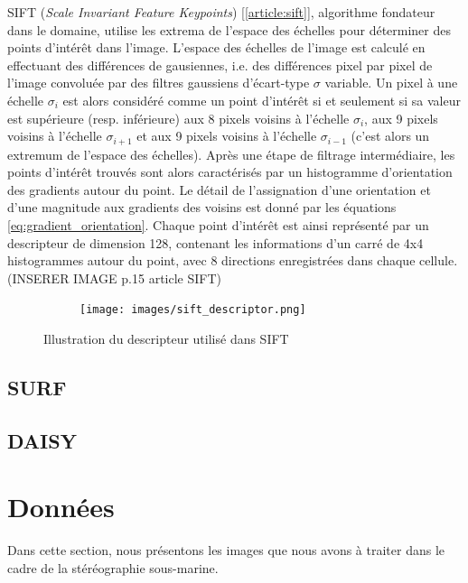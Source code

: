 \documentclass[
	a4paper, %
	10pt, %
	unnumberedsections, %
	twoside, %
]{LTJournalArticle}
\begin{document}
SIFT (\textit{Scale Invariant Feature Keypoints}) [\ref{article:sift}], algorithme fondateur dans le domaine, utilise les extrema de l'espace des échelles pour déterminer des points d'intérêt dans l'image.
L'espace des échelles de l'image est calculé en effectuant des différences de gausiennes, i.e. des différences pixel par pixel de l'image convoluée par des filtres gaussiens d'écart-type $\sigma$ variable.
Un pixel à une échelle $\sigma_i$ est alors considéré comme un point d'intérêt si et seulement si sa valeur est supérieure (resp. inférieure) aux 8 pixels voisins à l'échelle $\sigma_i$, aux 9 pixels voisins à l'échelle $\sigma_{i+1}$ et aux 9 pixels voisins à l'échelle $\sigma_{i-1}$ (c'est alors un extremum de l'espace des échelles).
Après une étape de filtrage intermédiaire, les points d'intérêt trouvés sont alors caractérisés par un histogramme d'orientation des gradients autour du point. 
Le détail de l'assignation d'une orientation et d'une magnitude aux gradients des voisins est donné par les équations \ref{eq:gradient_orientation}.
Chaque point d'intérêt est ainsi représenté par un descripteur de dimension 128, contenant les informations d'un carré de 4x4 histogrammes autour du point, avec 8 directions enregistrées dans chaque cellule. (INSERER IMAGE p.15 article SIFT)

\begin{figure}
	\centering
	\begin{subfigure}[H]{\columnwidth}
		\centering
		\texttt{[image: images/sift\_descriptor.png]}
	\end{subfigure}
	\label{figure:sift_descriptor}
	\caption{Illustration du descripteur utilisé dans SIFT}
\end{figure}

\subsection{SURF}

\subsection{DAISY}

\section{Données}

Dans cette section, nous présentons les images que nous avons à traiter dans le cadre de la stéréographie sous-marine.
\end{document}
